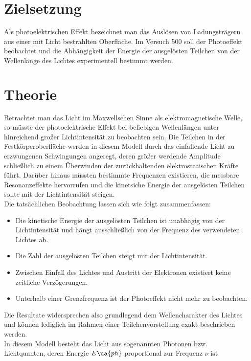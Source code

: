 \setcounter{page}{1}
\section*{Zielsetzung}
Als photoelektrischen Effekt bezeichnet man das Auslösen von Ladungsträgern aus einer
mit Licht bestrahlten Oberfläche. Im Versuch 500 soll der Photoeffekt beobachtet und die
Abhängigkeit der Energie der ausgelösten Teilchen von der Wellenlänge des Lichtes experimentell %
bestimmt werden.
\section{Theorie}
Betrachtet man das Licht im Maxwellschen Sinne als elektromagnetische Welle, so müsste
der photoelektrische Effekt bei beliebigen Wellenlängen unter hinreichend großer
Lichtintensität zu beobachten sein. Die Teilchen in der Festkörperoberfläche werden in diesem
Modell durch das einfallende Licht zu erzwungenen Schwingungen angeregt, deren größer werdende
Amplitude schließlich zu einem Überwinden der zurückhaltenden elektrostatischen Kräfte führt.
Darüber hinaus müssten bestimmte Frequenzen existieren, die messbare Resonanzeffekte hervorrufen und die kinetsiche
Energie der ausgelösten Teilchen sollte mit der Lichtintensität steigen.\\
Die tatsächlichen Beobachtung lassen sich wie folgt zusammenfassen:
\begin{itemize}
  \item Die kinetische Energie der ausgelösten Teilchen ist unabhägig von der Lichtintensität und
  hängt ausschließlich von der Frequenz des verwendeten Lichtes ab.
  \item Die Zahl der ausgelösten Teilchen steigt mit der Lichtintensität.
  \item Zwischen Einfall des Lichtes und Austritt der Elektronen existiert keine zeitliche Verzögerungen.
  \item Unterhalb einer Grenzfrequenz ist der Photoeffekt nicht mehr zu beobachten.
\end{itemize}
Die Resultate widersprechen also grundlegend dem Wellencharakter des Lichtes und können lediglich im
Rahmen einer Teilchenvorstellung exakt beschrieben werden.\\
In diesem Modell besteht das Licht aus sogenannten Photonen bzw. Lichtquanten, deren Energie $E\ua{ph}$ proportional
zur Frequenz $\nu$ ist
